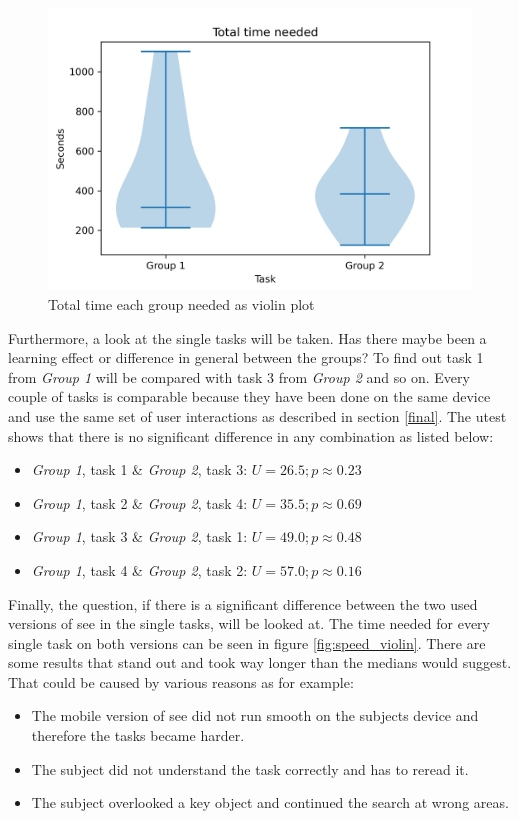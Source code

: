 \begin{figure}[htb]
  \centering
  \includegraphics*[width=1\textwidth]{Evaluation/img/group_time_violin.png}
  \caption{Total time each group needed as violin plot}
  \label{fig:group_time_violin}
\end{figure}

Furthermore, a look at the single tasks will be taken. 
Has there maybe been a learning effect or difference in general between the groups? 
To find out task 1 from \textit{Group 1} will be compared with task 3 from \textit{Group 2} and so on.
Every couple of tasks is comparable because they have been done on the same device and use the same set of user interactions as described in section \ref{final}.
The \gls{utest} shows that there is no significant difference in any combination as listed below:
\begin{itemize}
  \item \textit{Group 1}, task 1 \& \textit{Group 2}, task 3: $U = 26.5; p \approx 0.23$
  \item \textit{Group 1}, task 2 \& \textit{Group 2}, task 4: $U = 35.5; p \approx 0.69$
  \item \textit{Group 1}, task 3 \& \textit{Group 2}, task 1: $U = 49.0; p \approx 0.48$
  \item \textit{Group 1}, task 4 \& \textit{Group 2}, task 2: $U = 57.0; p \approx 0.16$
\end{itemize}

Finally, the question, if there is a significant difference between the two used versions of \gls{see} in the single tasks, will be looked at.
The time needed for every single task on both versions can be seen in figure \ref{fig:speed_violin}.
There are some results that stand out and took way longer than the medians would suggest.
That could be caused by various reasons as for example:
\begin{itemize}
  \item The mobile version of \gls{see} did not run smooth on the subjects device and therefore the tasks became harder.
  \item The subject did not understand the task correctly and has to reread it.
  \item The subject overlooked a key object and continued the search at wrong areas.
\end{itemize}

